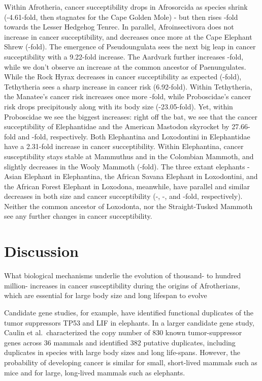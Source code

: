 \documentclass[10pt,letterpaper]{article}
\begin{document}
Within Afrotheria, cancer succeptibility drops in Afrosorcida as species
shrink (-4.61-fold, then stagnates for the Cape Golden Mole) - but then
rises -fold towards the Lesser Hedgehog Tenrec. In parallel,
Afroinsectivora does not increase in cancer succeptibility, and
decreases once more at the Cape Elephant Shrew (-fold). The emergence of
Pseudoungulata sees the next big leap in cancer succeptibility with a
9.22-fold increase. The Aardvark further increases -fold, while we don't
observe an increase at the common ancestor of Paenungulates. While the
Rock Hyrax decreases in cancer succeptibility as expected (-fold),
Tethytheria sees a sharp increase in cancer risk (6.92-fold). Within
Tethytheria, the Manatee's cancer risk increases once more -fold, while
Proboscidae's cancer risk drops precipitously along with its body size
(-23.05-fold). Yet, within Proboscidae we see the biggest increases:
right off the bat, we see that the cancer succeptibility of Elephantidae
and the American Mastodon skyrocket by 27.66-fold and -fold,
respectively. Both Elephantina and Loxodontini in Elephantidae have a
2.31-fold increase in cancer succeptibility. Within Elephantina, cancer
susceptibility stays stable at Mammuthus and in the Colombian Mammoth,
and slightly decreases in the Wooly Mammoth (-fold). The three extant
elephants - Asian Elephant in Elephantina, the African Savana Elephant
in Loxodontini, and the African Forest Elephant in Loxodona, meanwhile,
have parallel and similar decreases in both size and cancer
succeptibility (-, -, and -fold, respectively). Neither the common
ancestor of Loxodonta, nor the Straight-Tusked Mammoth see any further
changes in cancer succeptibility.

\hypertarget{discussion}{%
\section{Discussion}\label{discussion}}

What biological mechanisms underlie the evolution of thousand- to
hundred million- increases in cancer susceptibility during the origins
of Afrotherians, which are essential for large body size and long
lifespan to evolve

Candidate gene studies, for example, have identified functional
duplicates of the tumor suppressors TP53 and LIF in elephants. In a
larger candidate gene study, Caulin et al.~characterized the copy number
of 830 known tumor-suppressor genes across 36 mammals and identified 382
putative duplicates, including duplicates in species with large body
sizes and long life-spans. However, the probability of developing cancer
is similar for small, short-lived mammals such as mice and for large,
long-lived mammals such as elephants.
\end{document}
